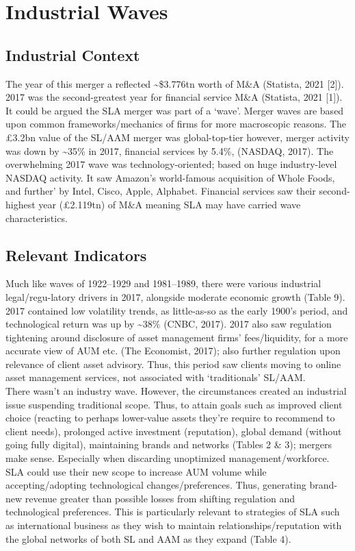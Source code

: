 \documentclass[11pt, english]{article}
\begin{document}
\newpage

\section{Industrial Waves}

	\subsection{Industrial Context}

The year of this merger a reflected \~{}\$3.776tn worth of M\&A (Statista, 2021 [2]). 2017 was the second-greatest year for financial service M\&A (Statista, 2021 [1]). It could be argued the SLA merger was part of a `wave'. Merger waves are based upon common frameworks/mechanics of firms for more macroscopic reasons. The \pounds3.2bn value of the SL/AAM merger was global-top-tier however, merger activity was down by \~{}35\% in 2017, financial services by 5.4\%, (NASDAQ, 2017). The overwhelming 2017 wave was technology-oriented; based on huge industry-level NASDAQ activity. It saw Amazon's world-famous acquisition of Whole Foods, and further' by Intel, Cisco, Apple, Alphabet. Financial services saw their second-highest year (\pounds2.119tn) of M\&A meaning SLA may have carried wave characteristics.

	\subsection{Relevant Indicators}

Much like waves of 1922--1929 and 1981--1989, there were various industrial legal/regu-latory drivers in 2017, alongside moderate economic growth (Table 9). 2017 contained low volatility trends, as little-as-so as the early 1900's period, and technological return was up by \~{}38\% (CNBC, 2017). 2017 also saw regulation tightening around disclosure of asset management firms' fees/liquidity, for a more accurate view of AUM etc. (The Economist, 2017); also further regulation upon relevance of client asset advisory. Thus, this period saw clients moving to online asset management services, not associated with `traditionals' SL/AAM.\\

There wasn't an industry wave. However, the circumstances created an industrial issue suspending traditional scope. Thus, to attain goals such as improved client choice (reacting to perhaps lower-value assets they're require to recommend to client needs), prolonged active investment (reputation), global demand (without going fully digital), maintaining brands and networks (Tables 2 \& 3); mergers make sense. Especially when discarding unoptimized management/workforce. SLA could use their new scope to increase AUM volume while accepting/adopting technological changes/preferences. Thus, generating brand-new revenue greater than possible losses from shifting regulation and technological preferences. This is particularly relevant to strategies of SLA such as international business as they wish to maintain relationships/reputation with the global networks of both SL and AAM as they expand (Table 4).
\end{document}
